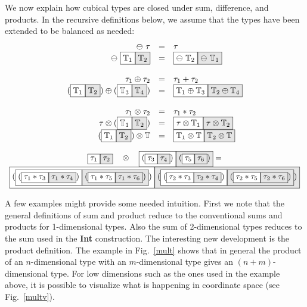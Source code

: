 \documentclass[authoryear,preprint]{sigplanconf}
\newcommand{\cubt}{\mathbb{T}}
\newcommand{\nodet}[2]{\fcolorbox{black}{white}{$#1$}\fcolorbox{black}{gray!20}{$#2$}}
\begin{document}
We now explain how cubical types are closed under sum, difference, and
products. In the recursive definitions below, we assume that the types have
been extended to be balanced as needed:
\[\begin{array}{rcl}
\ominus~\tau &=& \tau \\
\ominus~\nodet{\cubt_1}{\cubt_2} &=& \nodet{\ominus~\cubt_2}{\ominus~\cubt_1} \\
\\
\tau_1 \oplus \tau_2 &=& \tau_1 + \tau_2 \\
(\nodet{\cubt_1}{\cubt_2}) \oplus (\nodet{\cubt_3}{\cubt_4}) &=& 
  \nodet{\cubt_1 \oplus \cubt_3}{\cubt_2 \oplus \cubt_4} \\
\\
\tau_1 \otimes \tau_2 &=& \tau_1 * \tau_2 \\
\tau \otimes (\nodet{\cubt_1}{\cubt_2}) &=& 
  \nodet{\tau \otimes \cubt_1}{\tau \otimes \cubt_2} \\
(\nodet{\cubt_1}{\cubt_2}) \otimes \cubt &=& 
  \nodet{\cubt_1 \otimes \cubt}{\cubt_2 \otimes \cubt}
\end{array}\]

\begin{figure*}
\[\begin{array}{c}
\nodet{\tau_1}{\tau_2}
\quad\otimes\quad
\nodet{(\nodet{\tau_3}{\tau_4})}{(\nodet{\tau_5}{\tau_6})} = 
\\
\nodet{(\nodet{{(\nodet{\tau_1*\tau_3}{\tau_1*\tau_4})}}
              {{(\nodet{\tau_1*\tau_5}{\tau_1*\tau_6})}})}
      {(\nodet{{(\nodet{\tau_2*\tau_3}{\tau_2*\tau_4})}}
              {{(\nodet{\tau_2*\tau_5}{\tau_2*\tau_6})}})}
\end{array}\]
\caption{\label{mult}Example of multiplication of two cubical types.}
\end{figure*}

A few examples might provide some needed intuition. First we note that the
general definitions of sum and product reduce to the conventional sums and
products for 1-dimensional types. Also the sum of 2-dimensional types reduces
to the sum used in the \textbf{Int} construction. The interesting new
development is the product definition. The example in Fig.~\ref{mult} shows
that in general the product of an $n$-dimensional type with an
$m$-dimensional type gives an $(n+m)$-dimensional type. For low dimensions
such as the ones used in the example above, it is possible to visualize what
is happening in coordinate space (see Fig.~\ref{multv}).
\end{document}
